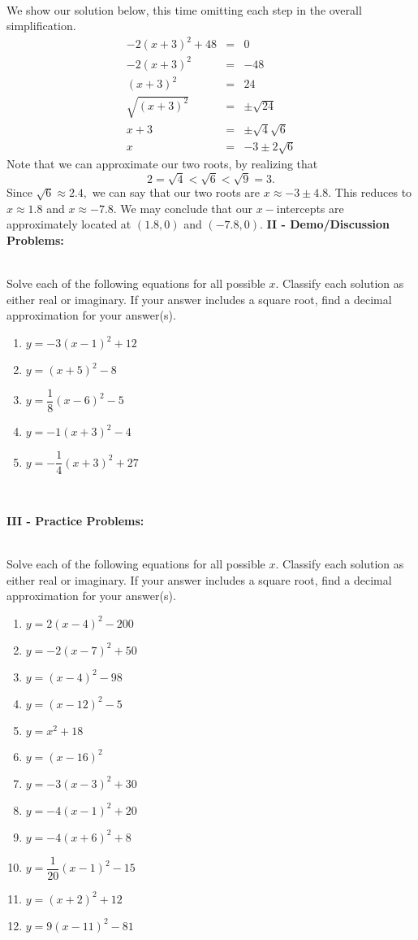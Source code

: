 \documentclass[12pt]{article}
\theoremstyle{definition}
\begin{document}
\ \par
We show our solution below, this time omitting each step in the overall simplification.
\begin{eqnarray*}
-2(x+3)^2+48 & = & 0 \\
-2(x+3)^2&=&-48 \\
(x+3)^2&=&24 \\
\sqrt{(x+3)^2}&=&\pm\sqrt{24}\\
x+3&=&\pm\sqrt{4}\sqrt{6}\\
x&=&-3\pm2\sqrt{6}
\end{eqnarray*}
Note that we can approximate our two roots, by realizing that 
$$2=\sqrt{4}<\sqrt{6}<\sqrt{9}=3.$$
Since $\sqrt{6}\approx 2.4,$ we can say that our two roots are $x\approx -3\pm 4.8.$  This reduces to $x\approx 1.8$ and $x\approx -7.8$.  We may conclude that our $x-$intercepts are approximately located at $(1.8,0)$ and $(-7.8,0)$.
\newpage
{\bf II - Demo/Discussion Problems:}\\
\ \par
Solve each of the following equations for all possible $x$.  Classify each solution as either real or imaginary.  If your answer includes a square root, find a decimal approximation for your answer(s).
\begin{enumerate}
	\item $y=-3(x-1)^2+12$
	\item $y=(x+5)^2-8$
	\item $y=\dfrac{1}{8}(x-6)^2-5$
	\item $y=-1(x+3)^2-4$
	\item $y=-\dfrac{1}{4}(x+3)^2+27$
	\end{enumerate}
\ \par
{\bf III - Practice Problems:}\\
\ \par
Solve each of the following equations for all possible $x$.  Classify each solution as either real or imaginary.  If your answer includes a square root, find a decimal approximation for your answer(s).
\begin{multicols}{3}
	\begin{enumerate}
	\item $y=2(x-4)^2-200$
  \item $y=-2(x-7)^2+50$
  \item $y=(x-4)^2-98$
  \item $y=(x-12)^2-5$
  \item $y=x^2+18$
  \item $y=(x-16)^2$
  \item $y=-3(x-3)^2+30$
  \item $y=-4(x-1)^2+20$
  \item $y=-4(x+6)^2+8$
  \item $y=\dfrac{1}{20}(x-1)^2-15$
  \item $y=(x+2)^2+12$
  \item $y=9(x-11)^2-81$
	\end{enumerate}
\end{multicols}
\newpage
\ \newpage
\end{document}
